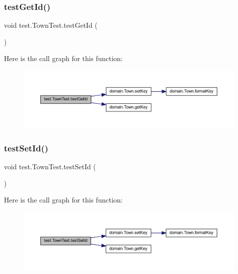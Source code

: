 \subsubsection{\texorpdfstring{test\+Get\+Id()}{testGetId()}}
{\footnotesize\ttfamily void test.\+Town\+Test.\+test\+Get\+Id (\begin{DoxyParamCaption}{ }\end{DoxyParamCaption})}

Here is the call graph for this function\+:\nopagebreak
\begin{figure}[H]
\begin{center}
\leavevmode
\includegraphics[width=350pt]{classtest_1_1_town_test_afb0700534b21a2cab187cf97aee0915b_cgraph}
\end{center}
\end{figure}
\mbox{\label{classtest_1_1_town_test_a9c9b33be480e6929f77a8402a72825ff}} 
\subsubsection{\texorpdfstring{test\+Set\+Id()}{testSetId()}}
{\footnotesize\ttfamily void test.\+Town\+Test.\+test\+Set\+Id (\begin{DoxyParamCaption}{ }\end{DoxyParamCaption})}

Here is the call graph for this function\+:\nopagebreak
\begin{figure}[H]
\begin{center}
\leavevmode
\includegraphics[width=350pt]{classtest_1_1_town_test_a9c9b33be480e6929f77a8402a72825ff_cgraph}
\end{center}
\end{figure}
\mbox{\label{classtest_1_1_town_test_a7cededa2b2d7c866897875e8b29f6c0d}} 
